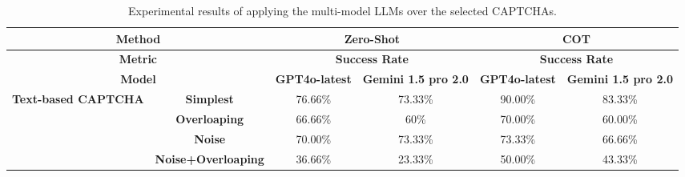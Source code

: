 \begin{table*}[t]
    \centering
    \tabcolsep=1.5pt
    \renewcommand{\arraystretch}{0.92} 
    \caption{Experimental results of applying the multi-model LLMs over the selected CAPTCHAs.}
    \begin{tabular}{cc|cccc}
    \hline
    \multicolumn{2}{c|}{\textbf{Method}}                                                            & \multicolumn{2}{c|}{\textbf{Zero-Shot}}                                                       & \multicolumn{2}{c}{\textbf{COT}}                                         \\ \hline
    \multicolumn{2}{c|}{\textbf{Metric}}                                                            & \multicolumn{2}{c|}{\textbf{Success Rate}}                                                    & \multicolumn{2}{c}{\textbf{Success Rate}}                                \\ \hline
    \multicolumn{2}{c|}{\textbf{Model}}                                                             & \multicolumn{1}{c|}{\textbf{GPT4o-latest}} & \multicolumn{1}{c|}{\textbf{Gemini 1.5 pro 2.0}} & \multicolumn{1}{c|}{\textbf{GPT4o-latest}} & \textbf{Gemini 1.5 pro 2.0} \\ \hline
    \multicolumn{1}{c|}{\multirow{4}{*}{\textbf{Text-based CAPTCHA}}}  & \textbf{Simplest}          & 76.66\%                                    & \multicolumn{1}{c|}{73.33\%}                     & 90.00\%                                    & 83.33\%                     \\
    \multicolumn{1}{c|}{}                                              & \textbf{Overloaping}       & 66.66\%                                    & \multicolumn{1}{c|}{60\%}                        & 70.00\%                                    & 60.00\%                     \\
    \multicolumn{1}{c|}{}                                              & \textbf{Noise}             & 70.00\%                                    & \multicolumn{1}{c|}{73.33\%}                     & 73.33\%                                    & 66.66\%                     \\
    \multicolumn{1}{c|}{}                                              & \textbf{Noise+Overloaping} & 36.66\%                                    & \multicolumn{1}{c|}{23.33\%}                     & 50.00\%                                    & 43.33\%                     \\ \hline

\end{tabular}
\end{table*}
